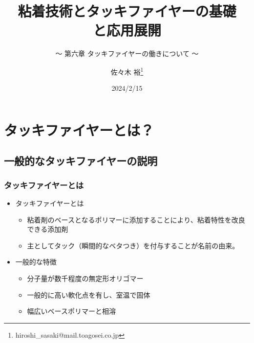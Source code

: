 \documentclass[unicode,12pt]{beamer}%
\title{粘着技術とタッキファイヤーの基礎\\と応用展開}
\subtitle{～ 第六章 タッキファイヤーの働きについて ～}
\author[東亞合成 佐々木]{佐々木 裕\thanks{hiroshi\_sasaki@mail.toagosei.co.jp}}
\institute[東亞合成]{東亞合成株式会社}
\date{2024/2/15}
\begin{document}
\maketitle

\begin{frame} 
    \tableofcontents[]
\end{frame} 


\section{タッキファイヤーとは？}
\subsection{一般的なタッキファイヤーの説明}

\begin{frame}
	\frametitle{タッキファイヤーとは}
		\begin{itemize}
			\item タッキファイヤーとは
			\begin{itemize}
				\item 粘着剤のベースとなるポリマーに添加することにより、粘着特性を改良できる添加剤
				\item 主としてタック（瞬間的なベタつき）を付与することが名前の由来。
			\end{itemize}
			\item 一般的な特徴
			\begin{itemize}
				\item \alert{分子量が数千程度}の無定形オリゴマー
				\item 一般的に\alert{高い軟化点}を有し、室温で固体
				\item 幅広いベースポリマーと\alert{相溶}
			\end{itemize}
		\end{itemize}
\end{frame}
\end{document}
